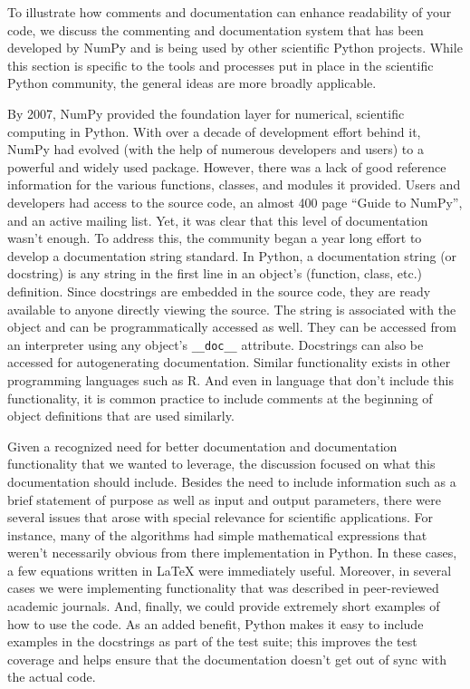 \documentclass[ChapterTOCs,krantz2]{krantz} %
\begin{document}
To illustrate how comments and documentation can enhance readability of your
code, we discuss the commenting and documentation system that has been
developed by NumPy and is being used by other scientific Python projects. While
this section is specific to the tools and processes put in place in the
scientific Python community, the general ideas are more broadly applicable.

By 2007, NumPy provided the foundation layer for numerical, scientific
computing in Python. With over a decade of development effort behind it, NumPy
had evolved (with the help of numerous developers and users) to a powerful and
widely used package. However, there was a lack of good reference information
for the various functions, classes, and modules it provided. Users and
developers had access to the source code, an almost 400 page ``Guide to
NumPy'', and an active mailing list. Yet, it was clear that this level of
documentation wasn't enough. To address this, the community began a year long
effort to develop a documentation string standard. In Python, a documentation
string (or docstring) is any string in the first line in an object's (function,
class, etc.) definition. Since docstrings are embedded in the source code, they
are ready available to anyone directly viewing the source. The string is
associated with the object and can be programmatically accessed as well.  They
can be accessed from an interpreter using any object's \texttt{\_\_doc\_\_}
attribute.  Docstrings can also be accessed for autogenerating documentation.
Similar functionality exists in other programming languages such as R. And even
in language that don't include this functionality, it is common practice to
include comments at the beginning of object definitions that are used
similarly.

Given a recognized need for better documentation and documentation
functionality that we wanted to leverage, the discussion focused on what this
documentation should include. Besides the need to include information such as a
brief statement of purpose as well as input and output parameters, there were
several issues that arose with special relevance for scientific applications.
For instance, many of the algorithms had simple mathematical expressions that
weren't necessarily obvious from there implementation in Python. In these
cases, a few equations written in \LaTeX{} were immediately useful. Moreover,
in several cases we were implementing functionality that was described in
peer-reviewed academic journals. And, finally, we could provide extremely
short examples of how to use the code. As an added benefit, Python makes it
easy to include examples in the docstrings as part of the test suite; this
improves the test coverage and helps ensure that the documentation doesn't get
out of sync with the actual code.
\end{document}

